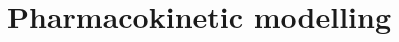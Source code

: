 \chapter{Pharmacokinetic modelling}
\label{chapter:pk}

\begin{comment}
The time-dependent distribution and disposition of a substance in a living system can be described by phamacokinetic (PK) models~\cite{gerlowski1983physiologically}. They aim to characterise a physiologic system by decomposing them into interacting compartments. Every of them is a homogenous, well-mixed space with the uniform tracer distribution \cite{PMID:20540902}.




PK models have very wide clinical application: from estimating the optimal drug dose to determining safe working environment while working with toxins  \cite{gerlowski1983physiologically}.
Given the fact that the contrast agent used in DCE-MRI examination can be considered as a substance flowing through the organism, pharmacokintetic modelling can also be used in analysis of so obtained data.   
This approach, called the parametric one, is based on fitting mathematical model to acquired tissue concentration time courses. In this way, the quantitative parameters can be assessed, which cannot be overestimated while evaluating the renal function. 



The time-dependent distribution and disposition
of a substance in a living system can be
described by phamacokinetic (PK) models [27].
They aim to characterise a physiologic system
by decomposing them into interacting compartments.
Every of them is a homogenous,
well-mixed space with the uniform tracer distribution
[28].
PK models have very wide clinical application:
from estimating the optimal drug dose to
determining safe working environment while
working with toxins [27]. Given the fact that
the contrast agent used in DCE-MRI examination
can be considered as a substance flowing
through the organism, pharmacokintetic modelling
can also be used in analysis of so obtained
data. This approach, called the parametric
one, is based on fitting mathematical model
to acquired tissue concentration time courses.
In this way, the quantitative parameters can be
assessed, which cannot be overestimated while
evaluating the renal function.
The compartment PK models decribe complex
blood-tissue exchanges and their theory
is based on the differential mass balance equations
[29]. An example of the system decribed
by two compartments is presented on Figure 5.
	

\begin{figure}
		\centering
		\texttt{[image: scheme]}
		\caption [DCE-MRI enhacement patterns]{Different DCE-MRI enhacement patterns \cite{khalifa2014models}}
		\label{fig:pk_draft}
	\end{figure}

\end{comment}